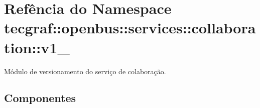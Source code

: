 \hypertarget{namespacetecgraf_1_1openbus_1_1services_1_1collaboration_1_1v1__0}{\section{\-Refência do \-Namespace tecgraf\-:\-:openbus\-:\-:services\-:\-:collaboration\-:\-:v1\-\_}
\label{namespacetecgraf_1_1openbus_1_1services_1_1collaboration_1_1v1__0}
}


\-Módulo de versionamento do serviço de colaboração.  


\subsection*{\-Componentes}
